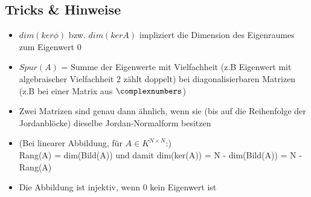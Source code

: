 \subsection{Tricks \& Hinweise}%
\label{jd:sub:tricks}

\begin{itemize}
	\item $dim(ker \phi)$ bzw. $dim(ker A)$ impliziert die Dimension des Eigenraumes zum Eigenwert 0
	\item $Spur(A)$ = Summe der Eigenwerte mit Vielfachheit (z.B Eigenwert mit algebraischer Vielfachheit 2 zählt doppelt) bei diagonalisierbaren Matrizen (z.B bei einer Matrix aus $\complexnumbers$)
	\item Zwei Matrizen sind genau dann ähnlich, wenn sie (bis auf die Reihenfolge der Jordanblöcke) dieselbe Jordan-Normalform besitzen
	\item (Bei linearer Abbildung, für $A \in K^{N\times N}$:)\\Rang(A) = dim(Bild(A)) und damit dim(ker(A)) = N - dim(Bild(A)) = N - Rang(A)
	\item Die Abbildung ist injektiv, wenn 0 kein Eigenwert ist
\end{itemize}